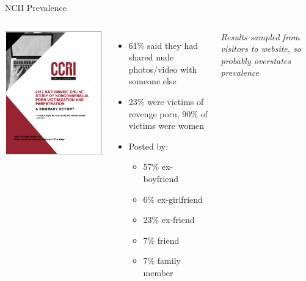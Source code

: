 \documentclass[nobackground,dvipsnames,table,aspectratio=169]{beamer}
\begin{document}
\begin{frame}{NCII Prevalence}
    \begin{columns}
            \includegraphics[width=\textwidth]{ccri-2017-report}
            \begin{itemize}
                \item 61\% said they had shared nude photos/video with someone else
                \item 23\% were victims of revenge porn, 90\% of victims were women
                \item Posted by:
                \begin{itemize}
                    \item 57\% ex-boyfriend
                    \item 6\% ex-girlfriend
                    \item 23\% ex-friend
                    \item 7\% friend
                    \item 7\% family member
                \end{itemize}
            \end{itemize}
            \textit{Results sampled from visitors to website, so probably overstates prevalence}
    \end{columns}
\end{frame}
\end{document}
